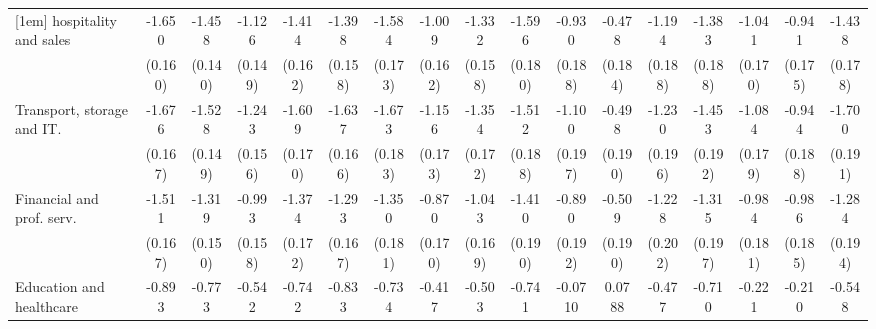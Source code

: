 {\begin{tabular}{l*{16}{c}}
[1em]
hospitality and sales&      -1.650\sym{***}&      -1.458\sym{***}&      -1.126\sym{***}&      -1.414\sym{***}&      -1.398\sym{***}&      -1.584\sym{***}&      -1.009\sym{***}&      -1.332\sym{***}&      -1.596\sym{***}&      -0.930\sym{***}&      -0.478\sym{**} &      -1.194\sym{***}&      -1.383\sym{***}&      -1.041\sym{***}&      -0.941\sym{***}&      -1.438\sym{***}\\
                    &     (0.160)         &     (0.140)         &     (0.149)         &     (0.162)         &     (0.158)         &     (0.173)         &     (0.162)         &     (0.158)         &     (0.180)         &     (0.188)         &     (0.184)         &     (0.188)         &     (0.188)         &     (0.170)         &     (0.175)         &     (0.178)         \\
[1em]
Transport, storage and IT.&      -1.676\sym{***}&      -1.528\sym{***}&      -1.243\sym{***}&      -1.609\sym{***}&      -1.637\sym{***}&      -1.673\sym{***}&      -1.156\sym{***}&      -1.354\sym{***}&      -1.512\sym{***}&      -1.100\sym{***}&      -0.498\sym{**} &      -1.230\sym{***}&      -1.453\sym{***}&      -1.084\sym{***}&      -0.944\sym{***}&      -1.700\sym{***}\\
                    &     (0.167)         &     (0.149)         &     (0.156)         &     (0.170)         &     (0.166)         &     (0.183)         &     (0.173)         &     (0.172)         &     (0.188)         &     (0.197)         &     (0.190)         &     (0.196)         &     (0.192)         &     (0.179)         &     (0.188)         &     (0.191)         \\
[1em]
Financial and prof. serv.&      -1.511\sym{***}&      -1.319\sym{***}&      -0.993\sym{***}&      -1.374\sym{***}&      -1.293\sym{***}&      -1.350\sym{***}&      -0.870\sym{***}&      -1.043\sym{***}&      -1.410\sym{***}&      -0.890\sym{***}&      -0.509\sym{**} &      -1.228\sym{***}&      -1.315\sym{***}&      -0.984\sym{***}&      -0.986\sym{***}&      -1.284\sym{***}\\
                    &     (0.167)         &     (0.150)         &     (0.158)         &     (0.172)         &     (0.167)         &     (0.181)         &     (0.170)         &     (0.169)         &     (0.190)         &     (0.192)         &     (0.190)         &     (0.202)         &     (0.197)         &     (0.181)         &     (0.185)         &     (0.194)         \\
[1em]
Education and healthcare&      -0.893\sym{***}&      -0.773\sym{***}&      -0.542\sym{**} &      -0.742\sym{***}&      -0.833\sym{***}&      -0.734\sym{***}&      -0.417\sym{*}  &      -0.503\sym{**} &      -0.741\sym{***}&     -0.0710         &      0.0788         &      -0.477\sym{*}  &      -0.710\sym{***}&      -0.221         &      -0.210         &      -0.548\sym{**} \\

\end{tabular}}

